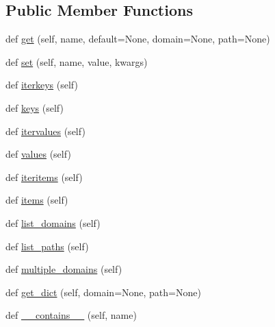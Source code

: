 \subsection*{Public Member Functions}
\begin{DoxyCompactItemize}
\item 
def \hyperlink{classpip_1_1__vendor_1_1requests_1_1cookies_1_1RequestsCookieJar_a5c12745e77ca2dca5e951e65ed6ce6cb}{get} (self, name, default=None, domain=None, path=None)
\item 
def \hyperlink{classpip_1_1__vendor_1_1requests_1_1cookies_1_1RequestsCookieJar_a260fad74070bef0c7425638900100707}{set} (self, name, value, kwargs)
\item 
def \hyperlink{classpip_1_1__vendor_1_1requests_1_1cookies_1_1RequestsCookieJar_a7844c31a11df29b737f6d2899743abaa}{iterkeys} (self)
\item 
def \hyperlink{classpip_1_1__vendor_1_1requests_1_1cookies_1_1RequestsCookieJar_a356a2e63096d6709bc43973d389208d3}{keys} (self)
\item 
def \hyperlink{classpip_1_1__vendor_1_1requests_1_1cookies_1_1RequestsCookieJar_a3ba97d46a1ab3f9106097d4e8f918779}{itervalues} (self)
\item 
def \hyperlink{classpip_1_1__vendor_1_1requests_1_1cookies_1_1RequestsCookieJar_ab1664c19386b98ad1335989e85f40ce0}{values} (self)
\item 
def \hyperlink{classpip_1_1__vendor_1_1requests_1_1cookies_1_1RequestsCookieJar_a4fdf3181e667a99344da4f476540ad1c}{iteritems} (self)
\item 
def \hyperlink{classpip_1_1__vendor_1_1requests_1_1cookies_1_1RequestsCookieJar_a16943d14660f257b695673e38162c0f7}{items} (self)
\item 
def \hyperlink{classpip_1_1__vendor_1_1requests_1_1cookies_1_1RequestsCookieJar_acaec0bacd8ec7eaf581431561d478320}{list\+\_\+domains} (self)
\item 
def \hyperlink{classpip_1_1__vendor_1_1requests_1_1cookies_1_1RequestsCookieJar_af922c3ca25c775188ed3a015274b53dc}{list\+\_\+paths} (self)
\item 
def \hyperlink{classpip_1_1__vendor_1_1requests_1_1cookies_1_1RequestsCookieJar_a8419465138f0436bdbb8dc75fc0ab016}{multiple\+\_\+domains} (self)
\item 
def \hyperlink{classpip_1_1__vendor_1_1requests_1_1cookies_1_1RequestsCookieJar_a791232395c3784d13c877e5d07cfa588}{get\+\_\+dict} (self, domain=None, path=None)
\item 
def \hyperlink{classpip_1_1__vendor_1_1requests_1_1cookies_1_1RequestsCookieJar_a204ad97ae999c03f08e3c7a843a02301}{\+\_\+\+\_\+contains\+\_\+\+\_\+} (self, name)

\end{DoxyCompactItemize}
